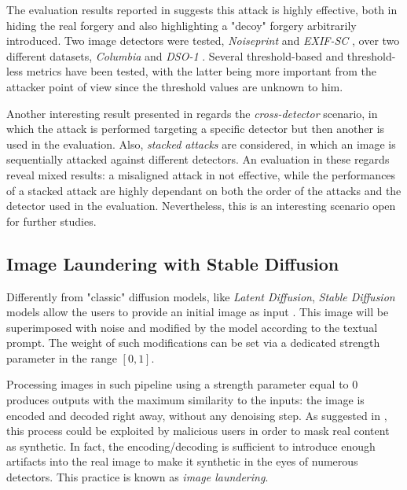 \documentclass[conference]{IEEEtran} %
\begin{document}
        The evaluation results reported in \cite{boato2024adversarial} suggests this attack is highly effective, both in hiding the real forgery and also highlighting a "decoy" forgery arbitrarily introduced. Two image detectors were tested, \textit{Noiseprint} \cite{cozzolino2019noiseprint} and \textit{EXIF-SC} \cite{huh2018fighting}, over two different datasets, \textit{Columbia} \cite{ng2004data} and \textit{DSO-1} \cite{carvalho2015illuminant}. Several threshold-based and threshold-less metrics have been tested, with the latter being more important from the attacker point of view since the threshold values are unknown to him.

        Another interesting result presented in \cite{boato2024adversarial} regards the \textit{cross-detector} scenario, in which the attack is performed targeting a specific detector but then another is used in the evaluation. Also, \textit{stacked attacks} are considered, in which an image is sequentially attacked against different detectors. An evaluation in these regards reveal mixed results: a misaligned attack in not effective, while the performances of a stacked attack are highly dependant on both the order of the attacks and the detector used in the evaluation. Nevertheless, this is an interesting scenario open for further studies.

    \subsection{Image Laundering with Stable Diffusion}
        \label{sec:laundering}
        Differently from "classic" diffusion models, like \textit{Latent Diffusion}, \textit{Stable Diffusion} models allow the users to provide an initial image as input \cite{sd1_github} \cite{sd2_github} \cite{podell2023sdxl} \cite{sauer2023adversarial-sdxl-turbo}. This image will be superimposed with noise and modified by the model according to the textual prompt. The weight of such modifications can be set via a dedicated strength parameter in the range $[0, 1]$.

        Processing images in such pipeline using a strength parameter equal to 0 produces outputs with the maximum similarity to the inputs: the image is encoded and decoded right away, without any denoising step. As suggested in \cite{mandelli2024synthetic}, this process could be exploited by malicious users in order to mask real content as synthetic. In fact, the encoding/decoding is sufficient to introduce enough artifacts into the real image to make it synthetic in the eyes of numerous detectors. This practice is known as \textit{image laundering}.
\end{document}
